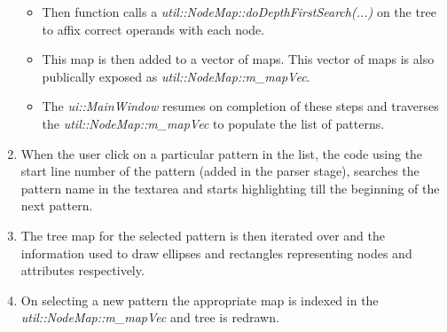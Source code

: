 \begin{enumerate}
{\begin{itemize}
  \item Then function calls a \emph{util::NodeMap::doDepthFirstSearch(...)} on the tree to affix correct operands with each node.
  \item This map is then added to a vector of maps. This vector of maps is also publically exposed as \emph{util::NodeMap::m\_mapVec}.
  \item The \emph{ui::MainWindow} resumes on completion of these steps and traverses the \emph{util::NodeMap::m\_mapVec} to populate the list of patterns.
 \end{itemize}  
 }
  \item When the user click on a particular pattern in the list, the code using the start line number of the pattern (added in the parser stage), searches the pattern name in the textarea and starts highlighting till the beginning of the next pattern.
  \item The tree map for the selected pattern is then iterated over and the information used to draw ellipses and rectangles representing nodes and attributes respectively.
  \item On selecting a new pattern the appropriate map is indexed in the \emph{util::NodeMap::m\_mapVec} and tree is redrawn.
\end{enumerate}

